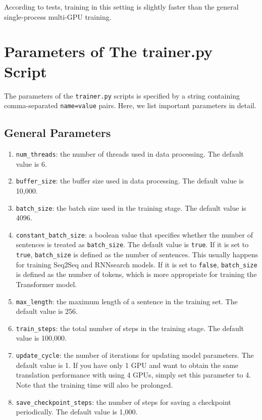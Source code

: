 \documentclass{article}
\begin{document}
According to tests, training in this setting is slightly faster than the general single-process multi-GPU training.

\appendix

\section{Parameters of The trainer.py Script} \label{appendix:1}
The parameters of the \verb|trainer.py| scripts is specified by a string containing comma-separated \verb|name=value| pairs. Here, we list important parameters in detail.

\subsection{General Parameters}
\begin{enumerate}
\item \verb|num_threads|: the number of threads used in data processing. The default value is 6.
\item \verb|buffer_size|: the buffer size used in data processing. The default value is 10,000.
\item \verb|batch_size|: the batch size used in the training stage. The default value is 4096.
\item \verb|constant_batch_size|: a boolean value that specifies whether the number of sentences is treated as \verb|batch_size|. The default value is \verb|true|. If it is set to \verb|true|, \verb|batch_size| is defined as the number of sentences. This usually happens for training Seq2Seq and RNNsearch models. If it is set to \verb|false|, \verb|batch_size| is defined as the number of tokens, which is more appropriate for training the Transformer model.
\item \verb|max_length|: the maximum length of a sentence in the training set. The default value is 256.
\item \verb|train_steps|: the total number of steps in the training stage. The default value is 100,000.
\item \verb|update_cycle|:  the number of iterations for updating model parameters. The default value is 1. If you have only 1 GPU and want to obtain the same translation performance with using 4 GPUs, simply set this parameter to 4. Note that the training time will also be prolonged.
\item \verb|save_checkpoint_steps|: the number of steps for saving a checkpoint periodically.  The default value is 1,000.

\end{enumerate}
\end{document}
